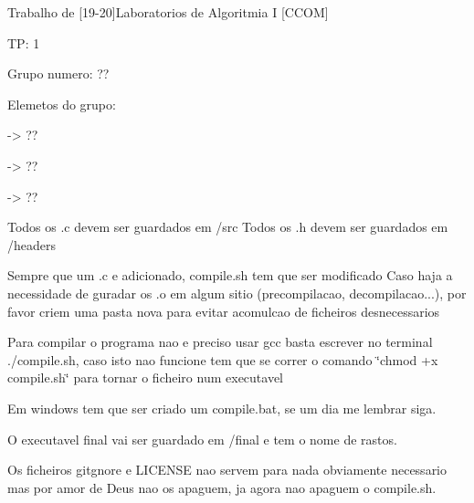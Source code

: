 Trabalho de \mbox{[}19-\/20\mbox{]}Laboratorios de Algoritmia I \mbox{[}C\+C\+OM\mbox{]}

TP\+: 1

Grupo numero\+: ??

Elemetos do grupo\+: \begin{DoxyVerb}-> ??

-> ??

-> ??
\end{DoxyVerb}


Todos os .c devem ser guardados em /src Todos os .h devem ser guardados em /headers

Sempre que um .c e adicionado, compile.\+sh tem que ser modificado Caso haja a necessidade de guradar os .o em algum sitio (precompilacao, decompilacao...), por favor criem uma pasta nova para evitar acomulcao de ficheiros desnecessarios

Para compilar o programa nao e preciso usar gcc basta escrever no terminal ./compile.sh, caso isto nao funcione tem que se correr o comando \char`\"{}chmod +x compile.\+sh\char`\"{} para tornar o ficheiro num executavel

Em windows tem que ser criado um compile.\+bat, se um dia me lembrar siga.

O executavel final vai ser guardado em /final e tem o nome de rastos.

Os ficheiros gitgnore e L\+I\+C\+E\+N\+SE nao servem para nada obviamente necessario mas por amor de Deus nao os apaguem, ja agora nao apaguem o compile.\+sh. 